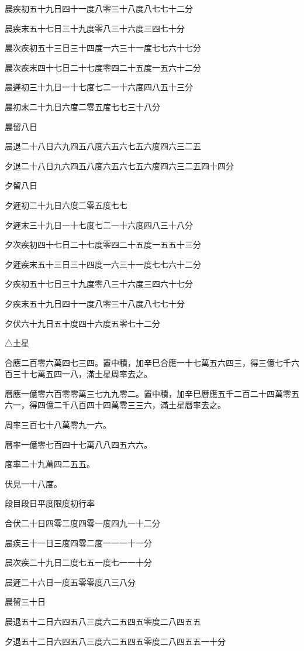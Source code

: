 晨疾初五十九日四十一度八零三十八度八七七十二分

晨疾末五十七日三十九度零八三十六度三四七十分

晨次疾初五十三日三十四度一六三十一度七七六十七分

晨次疾末四十七日二十七度零四二十五度一五六十二分

晨遲初三十九日一十七度七二一十六度四八五十三分

晨初末二十九日六度二零五度七七三十八分

晨留八日

晨退二十八日六九四五八度六五六七五六度四六三二五

夕退二十八日九六四五八度六五六七五六度四六三二五四十四分

夕留八日

夕遲初二十九日六度二零五度七七

夕遲末三十九日一十七度七二一十六度四八三十八分

夕次疾初四十七日二十七度零四二十五度一五五十三分

夕遲疾末五十三日三十四度一六三十一度七七六十二分

夕疾初五十七日三十九度零八三十六度三四六十七分

夕疾末五十九日四十一度八零三十八度八七七十分

夕伏六十九日五十度四十六度五零七十二分

△土星

合應二百零六萬四七三四。置中積，加辛巳合應一十七萬五六四三，得三億七千六百三十七萬五四一八，滿土星周率去之。

曆應一億零六百零零萬三七九九零二。置中積，加辛巳曆應五千二百二十四萬零五六一，得四億二千八百四十四萬零三三六，滿土星曆率去之。

周率三百七十八萬零九一六。

曆率一億零七百四十七萬八八四五六六。

度率二十九萬四二五五。

伏見一十八度。

段目段日平度限度初行率

合伏二十日四零二度四零一度四九一十二分

晨疾三十一日三度四零二度一一一十一分

晨次疾二十九日二度七五一度七一一十分

晨遲二十六日一度五零零度八三八分

晨留三十日

晨退五十二日六四五八三度六二五四五零度二八四五五

夕退五十二日六四五八三度六二五四五零度二八四五五一十分

